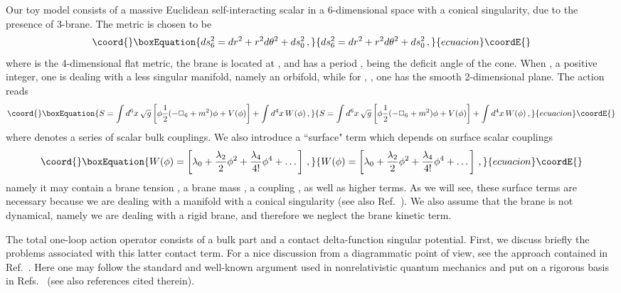 \documentclass[a4paper,aps,prl,preprint,groupedaddress,showpacs,nobibnotes,tightenlines]{revtex4}
\begin{document}
Our toy model consists of a massive Euclidean self-interacting scalar in 
a 6-dimensional space with a conical singularity, due to the
presence of 3-brane. The metric is chosen to be
\begin{equation}\coord{}\boxEquation{
ds_6^2=dr^2+r^2d\theta^2+ds^2_0\,,
\label{111}
}{
ds_6^2=dr^2+r^2d\theta^2+ds^2_0\,,
}{ecuacion}\coordE{}\end{equation}
where \coordHE{} is the 4-dimensional flat metric,  
the brane is located at \coordHE{}, and \myHighlight{$\theta$}\coordHE{} has a period \myHighlight{$\beta$}\coordHE{}, \myHighlight{$\beta $}\coordHE{} being
the deficit angle of the cone. When \coordHE{}, \coordHE{} a positive integer,
one is dealing with a less singular manifold, namely an orbifold, 
while for \coordHE{}, \myHighlight{$\beta= 2\pi$}\coordHE{}, one  has the smooth 2-dimensional plane.
The action  reads
\begin{equation}\coord{}\boxEquation{
S= \int d^6x\, \sqrt{g} \left[ \phi  \frac{1}{2}(-\Box_6+m^2  ) \phi+
V(\phi) \right]+\int d^4x\, W(\phi)\,,  
\label{2}
}{
S= \int d^6x\, \sqrt{g} \left[ \phi  \frac{1}{2}(-\Box_6+m^2  ) \phi+
V(\phi) \right]+\int d^4x\, W(\phi)\,,  
}{ecuacion}\coordE{}\end{equation}
where \coordHE{} denotes a series of 
scalar  bulk couplings. We also introduce 
 a ``surface" term which depends on surface scalar couplings
\begin{equation}\coord{}\boxEquation{
W(\phi)=\left[\lambda_0+\frac{\lambda_2}{2} \phi^2+\frac{\lambda_4}{4!} 
\phi^4+\dots\right]\,,  
}{
W(\phi)=\left[\lambda_0+\frac{\lambda_2}{2} \phi^2+\frac{\lambda_4}{4!} 
\phi^4+\dots\right]\,,  
}{ecuacion}\coordE{}\end{equation}
namely it may contain a brane tension \coordHE{}, a brane mass  
\coordHE{}, a \coordHE{} coupling \coordHE{}, as well as higher terms.
As we will see, these surface terms are necessary because we are dealing 
with a manifold with a conical singularity (see also Ref.~\cite{georgi}).
We also assume that the brane is not dynamical, namely we are dealing 
with a rigid brane, and therefore we  neglect the brane kinetic term.

The total one-loop action operator consists of a bulk part and a contact 
delta-function singular potential. First, we discuss briefly the problems 
associated with 
this latter contact term. For a nice discussion from a diagrammatic point of 
view, see the approach contained in Ref.~\cite{wise}.
Here one may follow the standard and well-known   argument used in 
nonrelativistic 
quantum mechanics and put on a rigorous basis in 
Refs.~\cite{faddeev,albeverio} (see also references cited therein).
\end{document}
